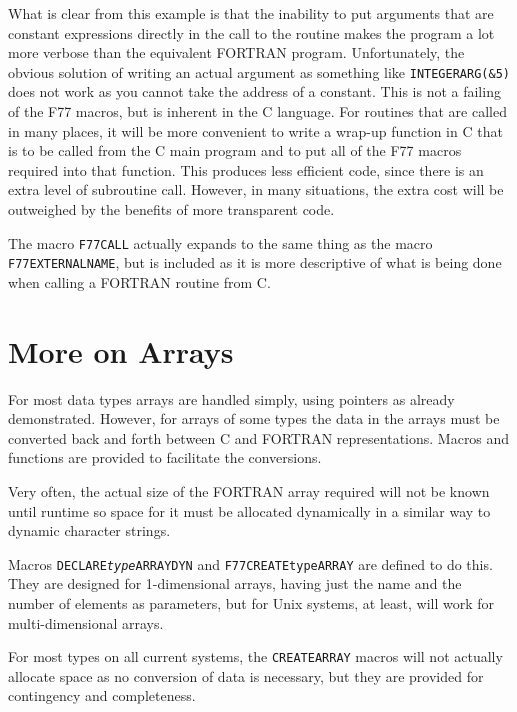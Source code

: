 \documentclass[twoside,11pt]{article}
\newcommand{\htmlref}[2]{#1}
\newcommand{\xlabel}[1]{}
\renewcommand{\_}{\texttt{\symbol{95}}}
\begin{document}
What is clear from this example is that the inability to put arguments that are
constant expressions directly in the call to the routine makes the program a
lot more verbose than the equivalent FORTRAN program. Unfortunately, the
obvious solution of writing an actual argument as something like 
\texttt{INTEGER\_ARG(\&5)} does not work as you cannot take the address of a 
constant.
This is not a failing of the F77 macros, but is inherent in the C language. For
routines that are called in many places, it will be more convenient to write a
wrap-up function in C that is to be called from the C main program and to put
all of the F77 macros required into that function. This produces less efficient
code, since there is an extra level of subroutine call. However, in many
situations, the extra cost will be outweighed by the benefits of more
transparent code.

The macro 
\htmlref{\texttt{F77\_CALL}}{F77_CALL}
actually expands to the same thing as the macro 
\htmlref{\texttt{F77\_\-EXTERNAL\_\-NAME}}{F77_EXTERNAL_NAME},
but is included as it is more descriptive of 
what is being done when calling a FORTRAN routine from C\@.

\section{\xlabel{more_on_arrays}More on Arrays}
For most data types arrays are handled simply, using pointers as already
demonstrated. However, for arrays of some types the data in the arrays
must be converted back and forth between C and FORTRAN representations. 
Macros and functions are provided to facilitate the conversions. 

Very often, the actual size of the FORTRAN array required will not be known 
until runtime so space for it must be allocated dynamically in a similar way
to 
\htmlref{dynamic character strings}{f77_chardyn}.

Macros  
\htmlref{\texttt{DECLARE\_\-\textit{type}\_\-ARRAY\_\-DYN}}
        {DECLARE_type_ARRAY_DYN}
and
\htmlref{\texttt{F77\_CREATE\_type\_ARRAY}}
        {F77_CREATE_type_ARRAY}
are defined to do this.
They are designed for 1-dimensional arrays, having just the name and the number
of elements as parameters, but for Unix systems, at least, will work for 
multi-dimensional arrays.

For most types on all current systems, the \texttt{CREATE\_ARRAY} macros
will not actually allocate space as no conversion of data is necessary, but
they are provided for contingency and completeness.
\end{document}
